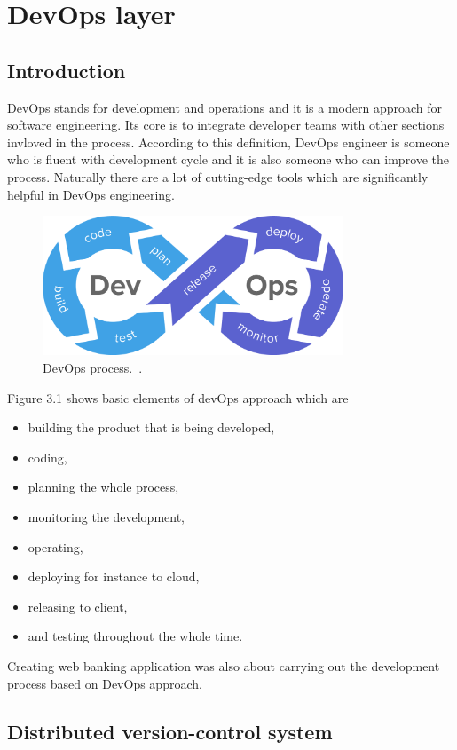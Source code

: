 \documentclass[a4paper,12pt]{book}
\newcommand\tab[1][1cm]{\hspace*{#1}}
\begin{document}
{{     
}

\chapter{DevOps layer}
\section{Introduction}
{
\tab DevOps stands for development and operations and it is a modern approach for software engineering. Its core is to integrate developer teams with other sections invloved in the process. According to this definition, DevOps engineer is someone who is fluent with development cycle and it is also someone who can improve the process. Naturally there are a lot of cutting-edge tools which are significantly helpful in DevOps engineering. 

\bigskip
\begin{figure}[H]
  \centering
    \includegraphics[width=0.8\textwidth]{devops}
    \caption{DevOps process.~\cite{devops}.}
\end{figure}
    
Figure 3.1 shows basic elements of devOps approach which are
\begin{itemize}
	\item building the product that is being developed,
	\item coding,
	\item planning the whole process,
	\item monitoring the development,
	\item operating,
	\item deploying for instance to cloud,
	\item releasing to client,
	\item and testing throughout the whole time.
\end{itemize} 
	
\bigskip
Creating web banking application was also about carrying out the development process based on DevOps approach. 
}
\section{Distributed version-control system}}
\end{document}
